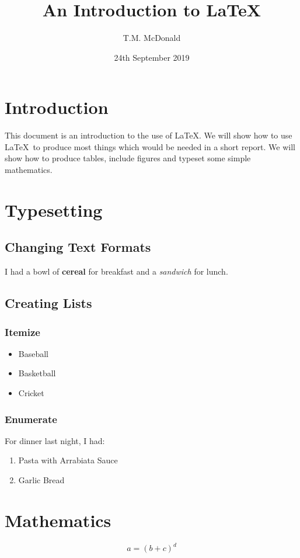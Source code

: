 \documentclass[a4paper, 10pt]{article}
\title{An Introduction to \LaTeX}
\author{T.M. McDonald}
\date{24th September 2019}
\begin{document}
\maketitle
\section{Introduction \label{S:Intro}}
This document is an introduction to the use of \LaTeX. We will show how to use \LaTeX\ to
produce most things which would be needed in a short report. We will show how to produce
tables, include figures and typeset some simple mathematics.

\section{Typesetting \label{S:Typesetting}}

\subsection{Changing Text Formats \label{S:Text Formats}}
I had a bowl of \textbf{cereal} for breakfast and a \emph{sandwich} for lunch.

\subsection{Creating Lists \label{S:Lists}}

\subsubsection{Itemize \label{S:Itemize}}
\begin{itemize}
\item Baseball
\item Basketball
\item Cricket
\end{itemize}

\subsubsection{Enumerate \label{S:Enumerate}}
For dinner last night, I had:
\begin{enumerate}
\item Pasta with Arrabiata Sauce
\item Garlic Bread
\end{enumerate}

\section{Mathematics \label{S:Maths}}
\begin{equation}
a = (b+c)^d \label{E:NewEq}
\end{equation}
\end{document}
